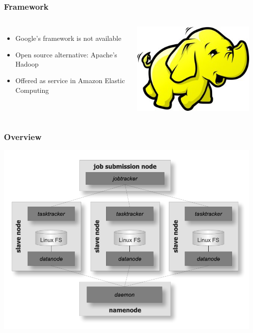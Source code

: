 \begin{frame}
\frametitle{Framework}

\begin{columns}
\begin{itemize}
\item Google's framework is not available
\item Open source alternative: Apache's Hadoop
\item Offered as service in Amazon Elastic Computing
\end{itemize}
 \includegraphics[width=\textwidth,keepaspectratio=true]{figs/12/hadoop}
\end{columns}
\end{frame}

\begin{frame}
\frametitle{Overview}
\begin{center}
\includegraphics[scale=0.7,keepaspectratio=true]{figs/12/hadoop_arch.pdf}
\end{center}

\end{frame}


